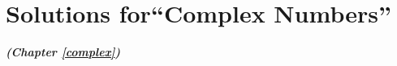 %
%
%
%
%


\section{Solutions for``Complex Numbers''}
\noindent\textbf{\textit{ (Chapter \ref{complex})}}\bigskip

